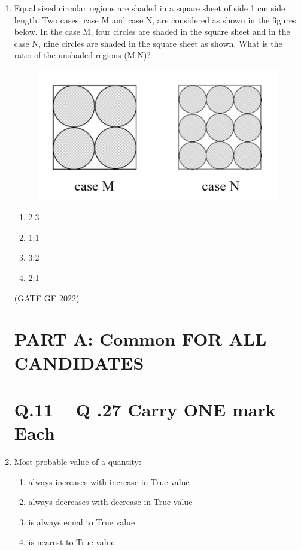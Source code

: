 \documentclass[a4paper, 11pt]{article}
\begin{document}
\begin{enumerate}
\item Equal sized circular regions are shaded in a square sheet of side 1 cm side length. Two cases, case M and case N, are considered as shown in the figures below. In the case M, four circles are shaded in the square sheet and in the case N, nine circles are shaded in the square sheet as shown.
What is the ratio of the unshaded regions (M:N)?
\begin{figure}[H]
    \centering
    \includegraphics[width=\columnwidth]{figs/fig_10.png}
    \label{fig:placeholder}
\end{figure}
\begin{enumerate}
    \item 2:3
    \item 1:1
    \item 3:2
    \item 2:1
\end{enumerate}

\hfill (GATE GE 2022)

\section{\textbf{PART A: Common FOR ALL CANDIDATES}}
\section{\textbf{Q.11 – Q .27 Carry ONE mark Each}}

\item Most probable value of a quantity:
\begin{enumerate}
    \item always increases with increase in True value
    \item always decreases with decrease in True value
    \item is always equal to True value
    \item is nearest to True value
\end{enumerate}


\end{enumerate}
\end{document}

